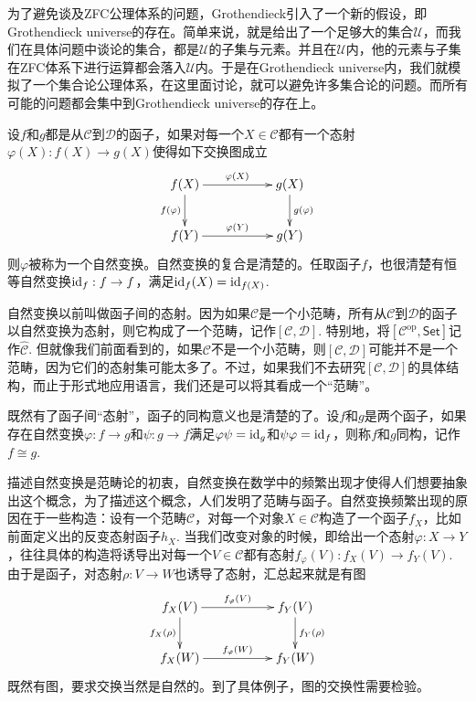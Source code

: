 为了避免谈及ZFC公理体系的问题，Grothendieck引入了一个新的假设，即Grothendieck universe的存在。简单来说，就是给出了一个足够大的集合$\mathscr{U}$，而我们在具体问题中谈论的集合，都是$\mathscr{U}$的子集与元素。并且在$\mathscr{U}$内，他的元素与子集在ZFC体系下进行运算都会落入$\mathscr{U}$内。于是在Grothendieck universe内，我们就模拟了一个集合论公理体系，在这里面讨论，就可以避免许多集合论的问题。而所有可能的问题都会集中到Grothendieck universe的存在上。

\para[自然变换] 设$f$和$g$都是从$\mathcal{C}$到$\mathcal{D}$的函子，如果对每一个$X\in \mathcal{C}$都有一个态射$\varphi(X):f(X)\to g(X)$使得如下交换图成立
\[
\begin{xy}
	\xymatrix{
		f(X)\ar[rr]^{\varphi(X)} \ar[d]_{f(\varphi)}&&g(X) \ar[d]^{g(\varphi)}\\
		f(Y)\ar[rr]^{\varphi(Y)}&&g(Y)
	}
\end{xy}
\]
则$\varphi$被称为一个自然变换。自然变换的复合是清楚的。任取函子$f$，也很清楚有恒等自然变换$\operatorname{id}_f:f\to f$，满足$\operatorname{id}_f(X)=\operatorname{id}_{f(X)}$.\endpara

自然变换以前叫做函子间的态射。因为如果$\mathcal{C}$是一个小范畴，所有从$\mathcal{C}$到$\mathcal{D}$的函子以自然变换为态射，则它构成了一个范畴，记作$[\mathcal{C},\mathcal{D}]$. 特别地，将$[\mathcal{C}^\text{op},\mathsf{Set}]$记作$\hat{\mathcal{C}}$. 但就像我们前面看到的，如果$\mathcal{C}$不是一个小范畴，则$[\mathcal{C},\mathcal{D}]$可能并不是一个范畴，因为它们的态射集可能太多了。不过，如果我们不去研究$[\mathcal{C},\mathcal{D}]$的具体结构，而止于形式地应用语言，我们还是可以将其看成一个“范畴”。

既然有了函子间“态射”，函子的同构意义也是清楚的了。设$f$和$g$是两个函子，如果存在自然变换$\varphi:f\to g$和$\psi:g\to f$满足$\varphi\psi=\operatorname{id}_g$和$\psi\varphi=\operatorname{id}_f$，则称$f$和$g$同构，记作$f\cong g$.

描述自然变换是范畴论的初衷，自然变换在数学中的频繁出现才使得人们想要抽象出这个概念，为了描述这个概念，人们发明了范畴与函子。自然变换频繁出现的原因在于一些构造：设有一个范畴$\mathcal{C}$，对每一个对象$X\in \mathcal{C}$构造了一个函子$f_X$，比如前面定义出的反变态射函子$h_X$. 当我们改变对象的时候，即给出一个态射$\varphi:X\to Y$，往往具体的构造将诱导出对每一个$V\in \mathcal{C}$都有态射$f_\varphi(V):f_X(V)\to f_Y(V)$. 由于是函子，对态射$\rho:V\to W$也诱导了态射，汇总起来就是有图
\[
\begin{xy}
	\xymatrix{
		f_X(V)\ar[rr]^{f_\varphi(V)} \ar[d]_{f_X(\rho)}&&f_Y(V) \ar[d]^{f_Y(\rho)}\\
		f_X(W)\ar[rr]^{f_\varphi(W)}&&f_Y(W)
	}
\end{xy}
\]
既然有图，要求交换当然是自然的。到了具体例子，图的交换性需要检验。

